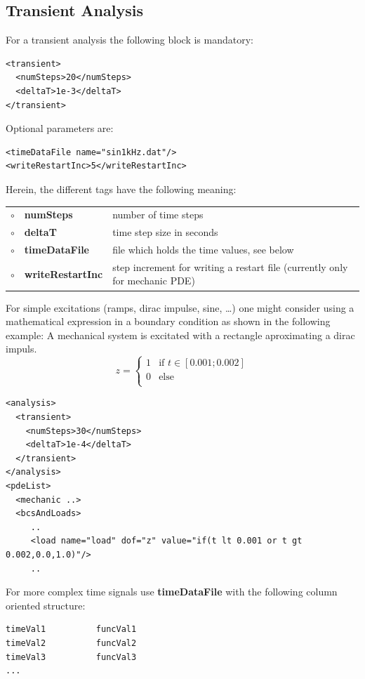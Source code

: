 \subsection{Transient Analysis}
%
For a transient analysis the following block is mandatory:
\begin{verbatim}
<transient>
  <numSteps>20</numSteps>
  <deltaT>1e-3</deltaT>
</transient>
\end{verbatim}
Optional parameters are:
\begin{verbatim}
<timeDataFile name="sin1kHz.dat"/>
<writeRestartInc>5</writeRestartInc>
\end{verbatim}
\noindent
Herein, the different tags have the following meaning:\\
\begin{tabular}{lll} 
$\circ$ & {\bf numSteps}    &  number of time steps\\
$\circ$ & {\bf deltaT }     &  time step size in seconds\\
$\circ$ & {\bf timeDataFile}&  file which holds the time values, see below\\
$\circ$ & {\bf writeRestartInc} & step increment for writing a restart
file (currently only for mechanic PDE)
\end{tabular}
\bigskip

\noindent
For simple excitations (ramps, dirac impulse, sine, \ldots) one might
consider using a mathematical expression in a boundary condition as
shown in the following example: A mechanical system is excitated with a rectangle aproximating a dirac impuls.   
\begin{displaymath}
z = \left\{ \begin{array}{ll}
1 & \textrm{if $t \in [0.001; 0.002]$}\\
0 & \textrm{else}\\
\end{array} \right.
\end{displaymath}
\begin{verbatim} 
<analysis>
  <transient>
    <numSteps>30</numSteps>
    <deltaT>1e-4</deltaT>
  </transient>
</analysis>
<pdeList>
  <mechanic ..>
  <bcsAndLoads>
     ..
     <load name="load" dof="z" value="if(t lt 0.001 or t gt 0.002,0.0,1.0)"/>
     ..
\end{verbatim}

\noindent
For more complex time signals use \textbf{timeDataFile} with the following column oriented
structure:
\begin{verbatim}
timeVal1          funcVal1
timeVal2          funcVal2
timeVal3          funcVal3
...
\end{verbatim}

